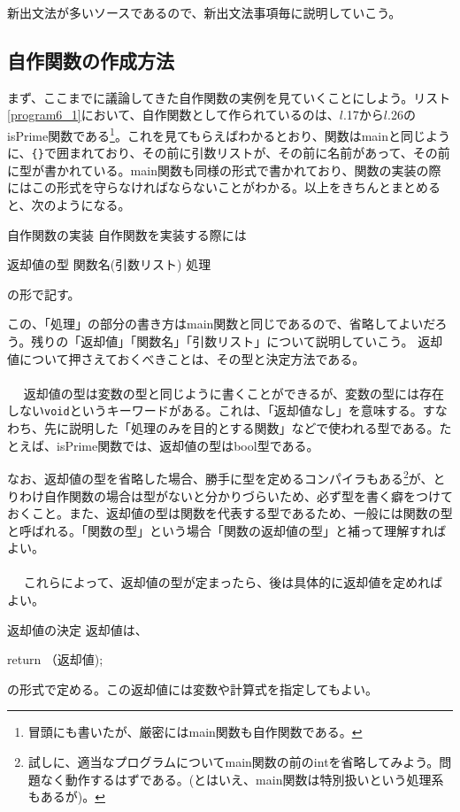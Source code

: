 新出文法が多いソースであるので、新出文法事項毎に説明していこう。

\subsection{自作関数の作成方法}
まず、ここまでに議論してきた自作関数の実例を見ていくことにしよう。リスト\ref{program6_1}において、自作関数として作られているのは、$l$.17から$l$.26のisPrime関数である\footnote{冒頭にも書いたが、厳密にはmain関数も自作関数である。}。これを見てもらえばわかるとおり、関数はmainと同じように、\verb|{}|で囲まれており、その前に引数リストが、その前に名前があって、その前に型が書かれている。main関数も同様の形式で書かれており、関数の実装の際にはこの形式を守らなければならないことがわかる。以上をきちんとまとめると、次のようになる。
\begin{itembox}[l]{自作関数の実装}
自作関数を実装する際には
\begin{code}
返却値の型 関数名(引数リスト){
  処理
}
\end{code}
の形で記す。
\end{itembox}
この、「処理」の部分の書き方はmain関数と同じであるので、省略してよいだろう。残りの「返却値」「関数名」「引数リスト」について説明していこう。
返却値について押さえておくべきことは、その型と決定方法である。
\\ \\　
返却値の型は変数の型と同じように書くことができるが、変数の型には存在しない\verb|void|というキーワードがある。これは、「返却値なし」を意味する。すなわち、先に説明した「処理のみを目的とする関数」などで使われる型である。たとえば、isPrime関数では、返却値の型はbool型である。

なお、返却値の型を省略した場合、勝手に型を定めるコンパイラもある\footnote{試しに、適当なプログラムについてmain関数の前のintを省略してみよう。問題なく動作するはずである。(とはいえ、main関数は特別扱いという処理系もあるが)。}が、とりわけ自作関数の場合は型がないと分かりづらいため、必ず型を書く癖をつけておくこと。また、返却値の型は関数を代表する型であるため、一般には関数の型と呼ばれる。「関数の型」という場合「関数の返却値の型」と補って理解すればよい。
\\ \\　
これらによって、返却値の型が定まったら、後は具体的に返却値を定めればよい。
\begin{itembox}[l]{返却値の決定}
返却値は、
\begin{code}
return （返却値);
\end{code}
の形式で定める。この返却値には変数や計算式を指定してもよい。
\end{itembox}

